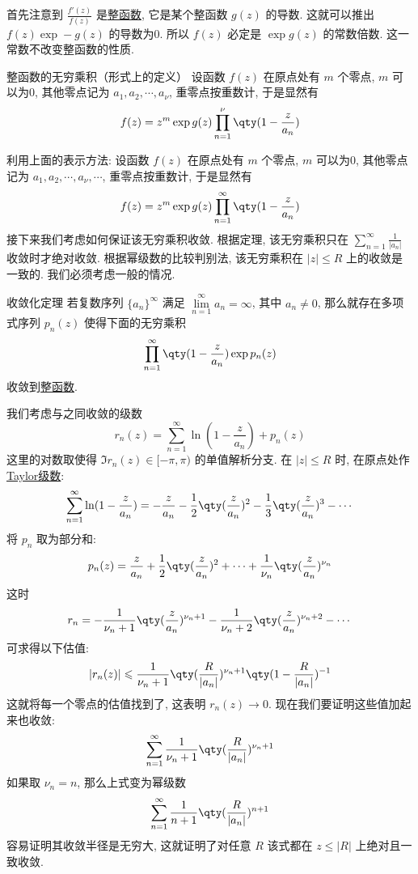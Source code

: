 \documentclass[UTF8]{ctexart}
\begin{document}
\begin{prf}
    首先注意到 \( \frac{f'(z)}{f(z)} \) 是\hyperref[dfn:EntireFunction]{整函数}, 它是某个整函数 \( g(z) \) 的导数. 这就可以推出 \( f(z)\exp -g(z) \) 的导数为0. 所以 \( f(z) \) 必定是 \( \exp g(z) \) 的常数倍数. 这一常数不改变整函数的性质. 
\end{prf}
\begin{dfn}
    {整函数的无穷乘积（形式上的定义）}
    设函数 \( f(z) \) 在原点处有 \( m \) 个零点,  \( m \) 可以为0, 其他零点记为 \( a_1,a_2,\cdots, a_\nu \), 重零点按重数计, 于是显然有
    \[f(z)=z^m\exp g(z)\prod_{n=1}^{\nu}\qty(1-\frac{z}{a_n})\]
\end{dfn}
利用上面的表示方法: 设函数 \( f(z) \) 在原点处有 \( m \) 个零点,  \( m \) 可以为0, 其他零点记为 \( a_1,a_2,\cdots, a_\nu, \cdots \), 重零点按重数计, 于是显然有
\[f(z)=z^m\exp g(z)\prod_{n=1}^{\infty}\qty(1-\frac{z}{a_n})\]
接下来我们考虑如何保证该无穷乘积收敛. 根据定理, 该无穷乘积只在 \( \sum\limits_{n=1}^{\infty}\frac{1}{|a_n|} \) 收敛时才绝对收敛. 根据幂级数的比较判别法, 该无穷乘积在 \( |z|\leqslant R \) 上的收敛是一致的. 我们必须考虑一般的情况. 
\begin{thm}
    {收敛化定理}
    若复数序列 \( \{a_n\}^\infty \) 满足 \( \lim\limits_{n=1}^{\infty}a_n=\infty \), 其中 \( a_n\neq 0 \), 那么就存在多项式序列 \( p_n(z) \) 使得下面的无穷乘积
    \[\prod_{n=1}^{\infty}\qty(1-\frac{z}{a_n})\exp p_n(z)\]
    收敛到\hyperref[dfn:EntireFunction]{整函数}.
\end{thm}
\begin{prf}
    我们考虑与之同收敛的级数
    \[r_n(z)=\sum_{n=1}^{\infty}\ln(1-\frac{z}{a_n})+p_n(z)\]
    这里的对数取使得 \( \Im r_n(z)\in[-\pi,\pi) \) 的单值解析分支. 在 \( |z|\leqslant R \) 时, 在原点处作\hyperref[thm:TaylorSeries]{Taylor级数}:
    \[\sum_{n=1}^{\infty}\ln(1-\frac{z}{a_n})=-\frac{z}{a_n}-\frac{1}{2}\qty(\frac{z}{a_n})^2-\frac{1}{3}\qty(\frac{z}{a_n})^3-\cdots\]
    将 \( p_n \) 取为部分和: 
    \[p_n(z)=\frac{z}{a_n}+\frac{1}{2}\qty(\frac{z}{a_n})^2+\cdots+\frac{1}{\nu_n}\qty(\frac{z}{a_n})^{\nu_n}\]
    这时
    \[r_n=-\frac{1}{\nu_n+1}\qty(\frac{z}{a_n})^{\nu_n+1}-\frac{1}{\nu_n+2}\qty(\frac{z}{a_n})^{\nu_n+2}-\cdots\]
    可求得以下估值: 
    \[|r_n(z)|\leqslant\frac{1}{\nu_n+1}\qty(\frac{R}{|a_n|})^{\nu_n+1}\qty(1-\frac{R}{|a_n|})^{-1} \]
    这就将每一个零点的估值找到了, 这表明 \( r_n(z)\to 0 \). 现在我们要证明这些值加起来也收敛: 
    \[\sum_{n=1}^{\infty}\frac{1}{\nu_n+1}\qty(\frac{R}{|a_n|})^{\nu_n+1}\]
    如果取 \( \nu_n=n \), 那么上式变为幂级数
    \[\sum_{n=1}^{\infty}\frac{1}{n+1}\qty(\frac{R}{|a_n|})^{n+1}\]
    容易证明其收敛半径是无穷大, 这就证明了对任意 \( R \) 该式都在 \( z\leq|R| \) 上绝对且一致收敛. 
\end{prf}
\end{document}
